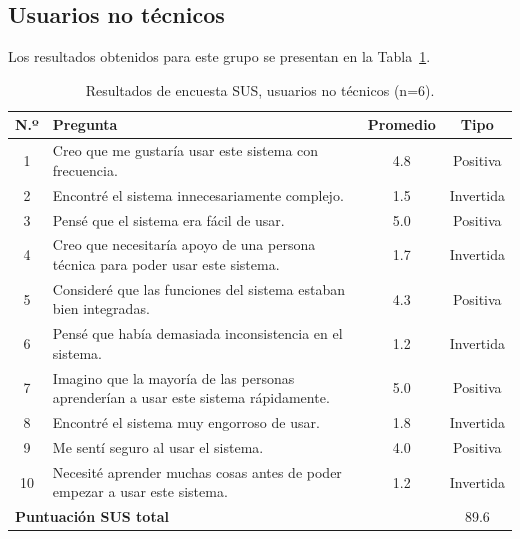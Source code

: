 \documentclass{iccmemoria}
\begin{document}
\subsection{Usuarios no técnicos}
Los resultados obtenidos para este grupo se presentan en la Tabla~\ref{tab:sus_notecnicos}.
\begin{table}[H]
\centering
\begin{tabular}{|c|p{8.5cm}|c|c|}
\hline
\textbf{N.º} & \textbf{Pregunta} & \textbf{Promedio} & \textbf{Tipo} \\
\hline
1 & Creo que me gustaría usar este sistema con frecuencia. & 4.8 & Positiva \\
2 & Encontré el sistema innecesariamente complejo. & 1.5 & Invertida \\
3 & Pensé que el sistema era fácil de usar. & 5.0 & Positiva \\
4 & Creo que necesitaría apoyo de una persona técnica para poder usar este sistema. & 1.7 & Invertida \\
5 & Consideré que las funciones del sistema estaban bien integradas. & 4.3 & Positiva \\
6 & Pensé que había demasiada inconsistencia en el sistema. & 1.2 & Invertida \\
7 & Imagino que la mayoría de las personas aprenderían a usar este sistema rápidamente. & 5.0 & Positiva \\
8 & Encontré el sistema muy engorroso de usar. & 1.8 & Invertida \\
9 & Me sentí seguro al usar el sistema. & 4.0 & Positiva \\
10 & Necesité aprender muchas cosas antes de poder empezar a usar este sistema. & 1.2 & Invertida \\
\hline
\multicolumn{3}{|l|}{\textbf{Puntuación SUS total}} & 89.6 \\
\hline
\end{tabular}
\caption{Resultados de encuesta SUS, usuarios no técnicos (n=6).}
\label{tab:sus_notecnicos}
\end{table}
\end{document}
